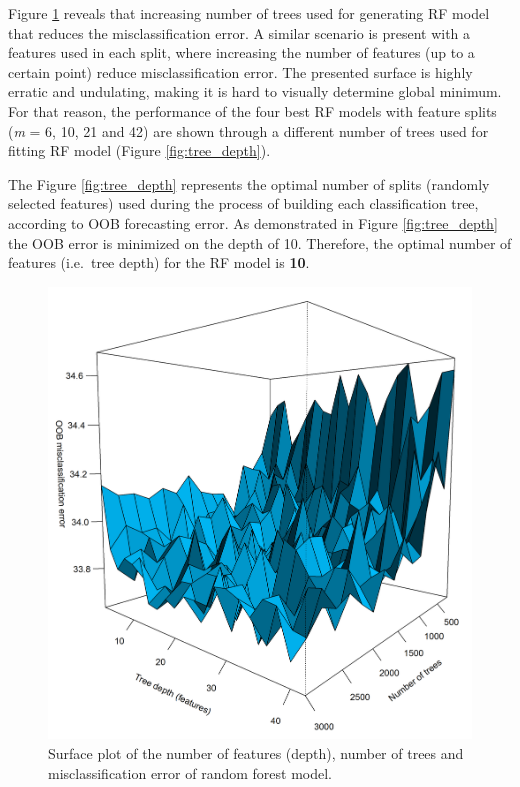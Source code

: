 \documentclass[]{elsarticle} %
\begin{document}
Figure \ref{fig:surface} reveals that increasing number of trees used
for generating RF model that reduces the misclassification error. A
similar scenario is present with a features used in each split, where
increasing the number of features (up to a certain point) reduce
misclassification error. The presented surface is highly erratic and
undulating, making it is hard to visually determine global minimum. For
that reason, the performance of the four best RF models with feature
splits (\emph{m} = 6, 10, 21 and 42) are shown through a different
number of trees used for fitting RF model (Figure \ref{fig:tree_depth}).

The Figure \ref{fig:tree_depth} represents the optimal number of splits
(randomly selected features) used during the process of building each
classification tree, according to OOB forecasting error. As demonstrated
in Figure \ref{fig:tree_depth} the OOB error is minimized on the depth
of 10. Therefore, the optimal number of features (i.e.~tree depth) for
the RF model is \textbf{10}.

\begin{figure}[H]

{\centering \includegraphics[width=0.7\linewidth]{img/300dpi/Fig_persp} 

}

\caption{Surface plot of the number of features (depth), number of trees and misclassification error of random forest model.}\label{fig:surface}
\end{figure}
\end{document}

